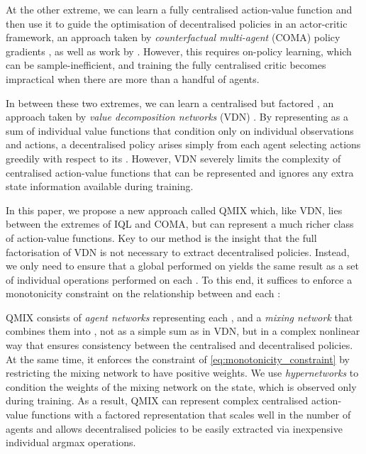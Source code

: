 \documentclass[twoside,11pt]{article}
\renewcommand{\cite}{\citep}
\begin{document}
At the other extreme, we can learn a fully centralised action-value function  and then use it to guide the optimisation of decentralised policies in an actor-critic framework, an approach taken by \emph{counterfactual multi-agent} (COMA) policy gradients \cite{foerster_counterfactual_2017}, as well as work by \citet{gupta_cooperative_2017}. However, this requires on-policy learning, which can be sample-inefficient, and training the fully centralised critic becomes impractical when there are more than a handful of agents.

In between these two extremes, we can learn a centralised but factored , an approach taken by \emph{value decomposition networks} (VDN) \cite{sunehag_value-decomposition_2017}. By representing  as a sum of individual value functions  that condition only on individual observations and actions, a decentralised policy arises simply from each agent selecting actions greedily with respect to its . However, VDN severely limits the complexity of centralised action-value functions that can be represented and ignores any extra state information available during training.

In this paper, we propose a new approach called QMIX which, like VDN, lies between the extremes of IQL and COMA, but can represent a much richer class of action-value functions. Key to our method is the insight that the full factorisation of VDN is not necessary to extract decentralised policies.  Instead, we only need to ensure that a global  performed on  yields the same result as a set of individual  operations performed on each .  To this end, it suffices to enforce a monotonicity constraint on the relationship between  and each :


QMIX consists of \textit{agent networks} representing each , and a 
\emph{mixing network} that combines them into , not as a simple sum as 
in VDN, but in a complex nonlinear way that ensures consistency between the 
centralised and decentralised policies.
At the same time, it enforces the 
constraint of \eqref{eq:monotonicity_constraint} by restricting the mixing 
network to have positive weights.
We use \emph{hypernetworks} \cite{ha_hypernetworks_2016} to condition the weights of the mixing network on the state, which is observed only during training.
As a result, QMIX can represent complex centralised action-value 
functions with a factored representation that scales well in the number of 
agents and allows decentralised policies to be easily extracted via inexpensive 
individual argmax operations.
\end{document}
